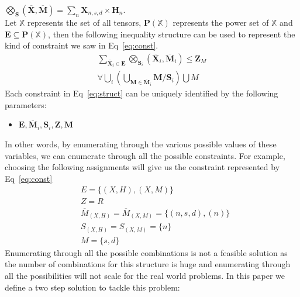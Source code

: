 \documentclass{article}
\newcommand{\TX}{\textbf{X}\xspace}
\newcommand{\TZ}{\textbf{Z}\xspace}
\newcommand{\TP}{\textbf{P}\xspace}
\newcommand{\TM}{\textbf{M}\xspace}
\newcommand{\TE}{\textbf{E}\xspace}
\begin{document}
$\bigotimes_{\textbf{S}}(\overline{\TX}, \overline{\TM})=\sum_{n} \TX_{n,s,d} \times \textbf{H}_{n}$.
\\
Let $\mathbb{X}$ represents the set of all tensors, $\TP(\mathbb{X})$ represents the power set of $\mathbb{X}$ and $\TE \subseteq \TP(\mathbb{X})$, then the following inequality structure can be used to represent the kind of constraint we saw in Eq~\ref{eq:const}.
\begin{multline}
\label{eq:struct}
	\displaystyle\sum\limits_{\overline{\TX}_i \in \TE}\bigotimes_{\textbf{S}_i}(\overline{\TX}_i,\overline{\TM}_i) \le \TZ_{M}\\ \forall \bigcup_{i}(\bigcup_{\TM \in \overline{\TM}_i} \TM / \textbf{S}_i) \bigcup M 
\end{multline}
Each constraint in Eq~\ref{eq:struct} can be uniquely identified by the following parameters:
\begin{itemize}
\item $\TE, \overline{\TM}_i,\textbf{S}_i, \TZ, \TM$
\end{itemize}
In other words, by enumerating through the various possible values of these variables, we can enumerate through all the possible constraints. For example, choosing the following assignments will give us the constraint represented by Eq~\ref{eq:const}
\begin{align*}
&E=\{(X,H),(X,M)\}\\
&Z=R\\
&\overline{M}_{(X,H)}=\overline{M}_{(X,M)}=\{(n,s,d), (n)\}\\
&S_{(X,H)}=S_{(X,M)}=\{n\}\\
&M=\{s,d\}
\end{align*}
Enumerating through all the possible combinations is not a feasible solution as the number of combinations for this structure is huge and enumerating through all the possibilities will not scale for the real world problems. In this paper we define a two step solution to tackle this problem:
\end{document}
